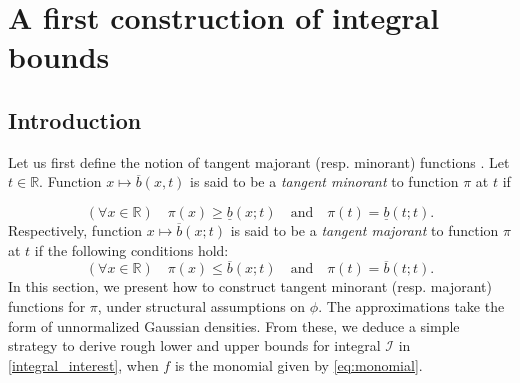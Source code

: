 \documentclass[review]{elsarticle}
\newcommand{\Ic}{\mathcal{I}}
\newcommand{\bR}{\mathbb{R}}
\newcommand{\emilie}[1]{\textcolor{magenta}{\textbf{[{\em EMILIE SAYS}: #1]}}}
\newcommand{\victor}[1]{\textcolor{blue}{\textbf{[{\em VICTOR SAYS}: #1]}}}
\begin{document}



\section{A first construction of integral bounds}
\label{sec_gaussbounds}
\subsection{Introduction}

Let us first define the notion of tangent majorant (resp. minorant) functions \cite{chouzenoux:hal-04250055}. Let $t \in \bR$. Function $x \mapsto \overline{b}(x,t)$ is said to be a \emph{tangent minorant} to function $\pi$ at $t$ if %

\begin{equation}
(\forall x \in \bR) \quad \pi(x) \geq \underline{b}(x;t) \quad \text{and} \quad \pi(t) = \underline{b}(t;t).
\label{eq_minor}
\end{equation}
Respectively, function $x \mapsto \overline{b}(x;t)$ is said to be a \emph{tangent majorant} to function $\pi$ at $t$ if the following conditions hold:
\begin{equation}
(\forall x \in \bR) \quad \pi(x) \leq \overline{b}(x;t) \quad \text{and} \quad \pi(t) = \overline{b}(t;t).
\label{eq_major}
\end{equation}
In this section, we present how to construct tangent minorant (resp. majorant) functions for $\pi$, under structural assumptions on $\phi$. The approximations take the form of unnormalized Gaussian densities. From these, we deduce a simple strategy to derive rough lower and upper bounds for integral $\Ic$ in \eqref{integral_interest}, when $f$ is the monomial given by \eqref{eq:monomial}. 
\end{document}
